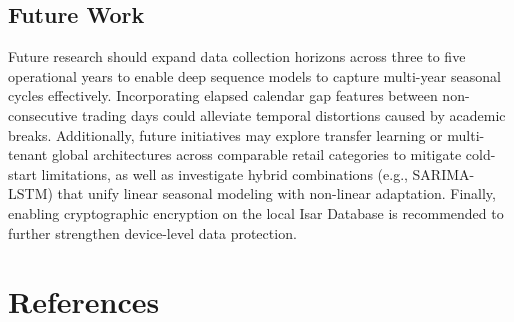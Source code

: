\documentclass[10pt,a4paper]{article}
\begin{document}
\subsection{Future Work}
Future research should expand data collection horizons across three to five operational years to enable deep sequence models to capture multi-year seasonal cycles effectively. Incorporating elapsed calendar gap features between non-consecutive trading days could alleviate temporal distortions caused by academic breaks. Additionally, future initiatives may explore transfer learning or multi-tenant global architectures across comparable retail categories to mitigate cold-start limitations, as well as investigate hybrid combinations (e.g., SARIMA-LSTM) that unify linear seasonal modeling with non-linear adaptation. Finally, enabling cryptographic encryption on the local Isar Database is recommended to further strengthen device-level data protection.

\section*{References}
\end{document}
